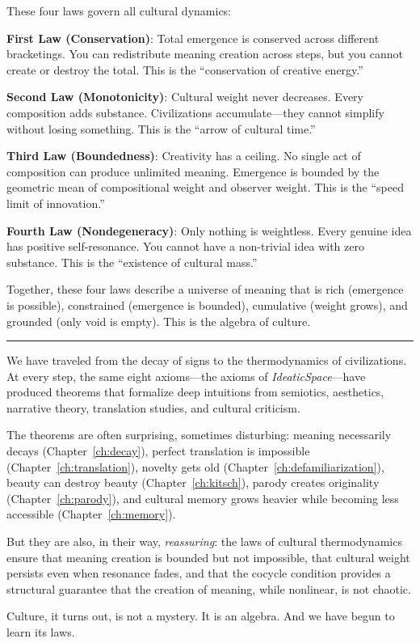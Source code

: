 \begin{interpretation}
These four laws govern all cultural dynamics:

\textbf{First Law (Conservation)}: Total emergence is conserved across
different bracketings.  You can redistribute meaning creation across
steps, but you cannot create or destroy the total.  This is the
``conservation of creative energy.''

\textbf{Second Law (Monotonicity)}: Cultural weight never decreases.
Every composition adds substance.  Civilizations accumulate---they
cannot simplify without losing something.  This is the ``arrow of
cultural time.''

\textbf{Third Law (Boundedness)}: Creativity has a ceiling.  No
single act of composition can produce unlimited meaning.  Emergence
is bounded by the geometric mean of compositional weight and
observer weight.  This is the ``speed limit of innovation.''

\textbf{Fourth Law (Nondegeneracy)}: Only nothing is weightless.
Every genuine idea has positive self-resonance.  You cannot have
a non-trivial idea with zero substance.  This is the ``existence
of cultural mass.''

Together, these four laws describe a universe of meaning that is
rich (emergence is possible), constrained (emergence is bounded),
cumulative (weight grows), and grounded (only void is empty).
This is the algebra of culture.
\end{interpretation}

\bigskip

\begin{center}
\rule{0.5\textwidth}{0.5pt}
\end{center}

\bigskip

\noindent We have traveled from the decay of signs to the thermodynamics
of civilizations.  At every step, the same eight axioms---the axioms
of \emph{IdeaticSpace}---have produced theorems that formalize deep
intuitions from semiotics, aesthetics, narrative theory, translation
studies, and cultural criticism.

The theorems are often surprising, sometimes disturbing: meaning
necessarily decays (Chapter~\ref{ch:decay}), perfect translation is
impossible (Chapter~\ref{ch:translation}), novelty gets old
(Chapter~\ref{ch:defamiliarization}), beauty can destroy beauty
(Chapter~\ref{ch:kitsch}), parody creates originality
(Chapter~\ref{ch:parody}), and cultural memory grows heavier while
becoming less accessible (Chapter~\ref{ch:memory}).

But they are also, in their way, \emph{reassuring}: the laws of cultural
thermodynamics ensure that meaning creation is bounded but not
impossible, that cultural weight persists even when resonance fades,
and that the cocycle condition provides a structural guarantee that the
creation of meaning, while nonlinear, is not chaotic.

Culture, it turns out, is not a mystery.  It is an algebra.
And we have begun to learn its laws.
